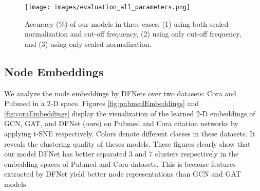 \documentclass{article}
\begin{document}
\begin{comment}
\begin{table}[ht]
\centering \begin{tabular}{l l c c c} \specialrule{.1em}{.05em}{.05em} Description & Model & Cora & Citeseer & Pubmed \\ [0.5ex] \hline \multirow{3}{12em}{Scaled-normalization} & DFNet & \textbf{85.2} & \textbf{74.2} & \textbf{84.3} \\ 
& DFNet-ATT & \textbf{86.0} & \textbf{74.7} & \textbf{85.2} \\ 
& DF-ATT & \textbf{83.4} & \textbf{73.1} & \textbf{82.3} \\ 
\hline \multirow{3}{12em}{Laplacian without scaled-normalize technique} & DFNet & 46.6 & 33.2 & 82.8 \\ 
& DFNet-ATT & 45.1 & 47.2 & 81.1 \\ 
& DF-ATT & 73.9 & 58.5 & 71.8 \\ 
\hline \multirow{3}{12em}{Without \smallskip
\noindent\textbf{Laplacian without cut-off frequency technique}} & DFNet & 53.7 & 35.1 & 70.2 \\ 
& DFNet-ATT & 50.9 & 40.2 & 82.4 \\ 
& DF-ATT & 75.4 & 66.5 & 81.3 \\ 
\specialrule{.1em}{.05em}{.05em} \end{tabular}
\label{table:nonlin} \end{table}
\end{comment}

\begin{figure}[t!]
    \vspace{-0.5cm}\centering
    \texttt{[image: images/evaluation\_all\_parameters.png]}
    \caption{Accuracy (\%) of our models in three cases: (1) using both scaled-normalization and cut-off frequency, (2) using only cut-off frequency, and (3) using only scaled-normalization.  
    \label{fig:evalParams}}\vspace{-0.3cm}
\end{figure}

\subsection{Node Embeddings}
We analyze the node embeddings by DFNets over two datasets: Cora and Pubmed in a 2-D space. Figures \ref{fig:pubmedEmbeddings} and \ref{fig:coraEmbeddings} display the visualization of the learned 2-D embeddings of GCN, GAT, and DFNet (ours) on Pubmed and Cora citation networks by applying t-SNE \cite{maaten2008visualizing} respectively.
Colors denote different classes in these datasets. It reveals the clustering quality of theses models. These figures clearly show that our model DFNet has better separated 3 and 7 clusters respectively in the embedding spaces of Pubmed and Cora datasets. This is because features extracted by DFNet yield better node representations than GCN and GAT models.
\end{document}
